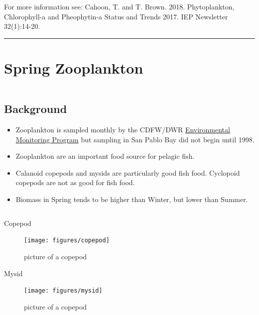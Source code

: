 \documentclass[
]{book}
\providecommand{\tightlist}{%
  \setlength{\itemsep}{0pt}\setlength{\parskip}{0pt}}
\begin{document}
\begin{disclaimer}
For more information see: Cahoon, T. and T. Brown. 2018. Phytoplankton,
Chlorophyll-a and Pheophytin-a Status and Trends 2017. IEP Newsletter
32(1):14-20.
\end{disclaimer}

\begin{center}\rule{0.5\linewidth}{0.5pt}\end{center}

\hypertarget{spring-zooplankton}{%
\section{Spring Zooplankton}\label{spring-zooplankton}}

\begin{columns-nocenter}

\begin{column}

\hypertarget{background-3}{%
\subsection{Background}\label{background-3}}

\begin{itemize}
\tightlist
\item
  Zooplankton is sampled monthly by the CDFW/DWR \href{https://emp.baydeltalive.com/wiki/12297}{Environmental Monitoring Program} but sampling in San Pablo Bay did not begin until 1998.
\item
  Zooplankton are an important food source for pelagic fish.
\item
  Calanoid copepods and mysids are particularly good fish food. Cyclopoid copepods are not as good for fish food.
\item
  Biomass in Spring tends to be higher than Winter, but lower than Summer.
\end{itemize}

\end{column}

\begin{column}

Copepod

\begin{figure}

{\centering \texttt{[image: figures/copepod]} 

}

\caption{picture of a copepod}\label{fig:unnamed-chunk-24}
\end{figure}

Mysid

\begin{figure}

{\centering \texttt{[image: figures/mysid]} 

}

\caption{picture of a copepod}\label{fig:unnamed-chunk-25}
\end{figure}

\end{column}

\end{columns-nocenter}
\end{document}
